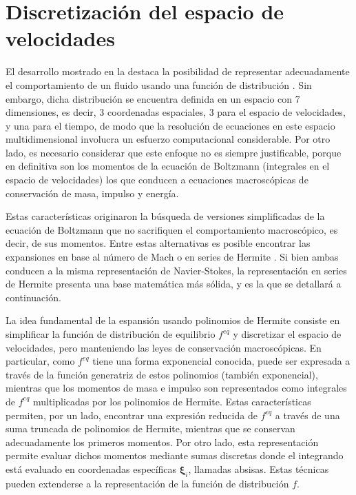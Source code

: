 \section{Discretizaci\'on del espacio de velocidades} 
El desarrollo mostrado en la  destaca la posibilidad de representar adecuadamente el comportamiento de un fluido usando una funci\'on de distribuci\'on \fvar{}. Sin embargo, dicha distribuci\'on se encuentra definida en un espacio con 7 dimensiones, es decir, 3 coordenadas espaciales, 3 para el espacio de velocidades, y una para el tiempo, de modo que la resoluci\'on de ecuaciones en este espacio multidimensional involucra un esfuerzo computacional considerable. Por otro lado, es necesario considerar que este enfoque no es siempre justificable, porque en definitiva son los momentos de la ecuaci\'on de Boltzmann (integrales en el espacio de velocidades) los que conducen a ecuaciones macrosc\'opicas de conservaci\'on de masa, impulso y energ\'ia. 
\par 
Estas caracter\'isticas originaron la b\'usqueda de versiones simplificadas de la ecuaci\'on de Boltzmann que no sacrifiquen el comportamiento macrosc\'opico, es decir, de sus momentos. Entre estas alternativas es posible encontrar las expansiones en base al n\'umero de Mach \cite{he_lattice_1997} o en series de Hermite \cite{shan_kinetic_2006}. Si bien ambas conducen a la misma representaci\'on de Navier-Stokes, la representaci\'on en series de Hermite presenta una base matem\'atica m\'as s\'olida, y es la que se detallar\'a a continuaci\'on.
\par
La idea fundamental de la espansi\'on usando polinomios de Hermite consiste en simplificar la funci\'on de distribuci\'on de equilibrio $f^{eq}$ y discretizar el espacio de velocidades, pero manteniendo las leyes de conservaci\'on macrosc\'opicas. En particular, como $f^{eq}$ tiene una forma exponencial conocida, puede ser expresada a trav\'es de la funci\'on generatriz de estos polinomios (tambi\'en exponencial), mientras que los momentos de masa e impulso son representados como integrales de $f^{eq}$ multiplicadas por los polinomios de Hermite. Estas caracter\'isticas permiten, por un lado, encontrar una expresi\'on reducida de $f^{eq}$ a trav\'es de una suma truncada de polinomios de Hermite, mientras que se conservan adecuadamente los primeros momentos. Por otro lado, esta representaci\'on permite evaluar dichos momentos mediante sumas discretas donde el integrando est\'a evaluado en coordenadas espec\'ificas $\bm{\xi}_i$, llamadas absisas. Estas t\'ecnicas pueden extenderse a la representaci\'on de la funci\'on de distribuci\'on $f$.


